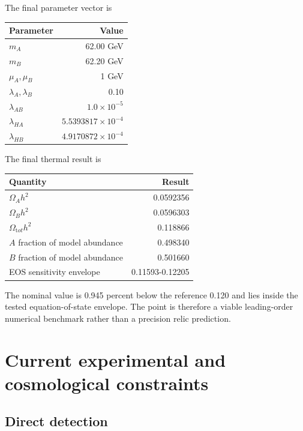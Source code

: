\documentclass[
]{article}
\begin{document}
The final parameter vector is

\begin{longtable}[]{@{}lr@{}}
\toprule\noalign{}
Parameter & Value \\
\midrule\noalign{}
\endhead
\bottomrule\noalign{}
\endlastfoot
\(m_A\) & 62.00 GeV \\
\(m_B\) & 62.20 GeV \\
\(\mu_A,\mu_B\) & 1 GeV \\
\(\lambda_A,\lambda_B\) & 0.10 \\
\(\lambda_{AB}\) & \(1.0\times10^{-5}\) \\
\(\lambda_{HA}\) & \(5.5393817\times10^{-4}\) \\
\(\lambda_{HB}\) & \(4.9170872\times10^{-4}\) \\
\end{longtable}

The final thermal result is

\begin{longtable}[]{@{}lr@{}}
\toprule\noalign{}
Quantity & Result \\
\midrule\noalign{}
\endhead
\bottomrule\noalign{}
\endlastfoot
\(\Omega_Ah^2\) & 0.0592356 \\
\(\Omega_Bh^2\) & 0.0596303 \\
\(\Omega_{\mathrm tot}h^2\) & 0.118866 \\
\(A\) fraction of model abundance & 0.498340 \\
\(B\) fraction of model abundance & 0.501660 \\
EOS sensitivity envelope & 0.11593-0.12205 \\
\end{longtable}

The nominal value is 0.945 percent below the reference 0.120 and lies
inside the tested equation-of-state envelope. The point is therefore a
viable leading-order numerical benchmark rather than a precision relic
prediction.

\hypertarget{current-experimental-and-cosmological-constraints}{%
\section{Current experimental and cosmological
constraints}\label{current-experimental-and-cosmological-constraints}}

\hypertarget{direct-detection}{%
\subsection{Direct detection}\label{direct-detection}}
\end{document}
